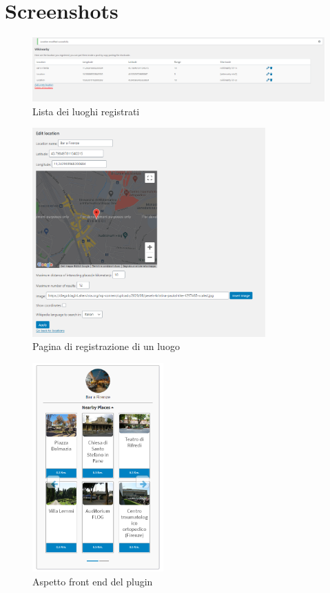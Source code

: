 \section*{Screenshots}

\begin{figure}[H]
\includegraphics[width=15cm]{images/loc_list.png}
\caption{Lista dei luoghi registrati}
\label{fig:orig_normal}
\centering
\end{figure}

\begin{figure}[H]
\includegraphics[height=8cm]{images/location_edit.png}
\caption{Pagina di registrazione di un luogo}
\label{fig:orig_normal}
\centering
\end{figure}

\begin{figure}[H]
\includegraphics[height=8cm]{images/fend.png}
\caption{Aspetto front end del plugin}
\label{fig:orig_normal}
\centering
\end{figure}